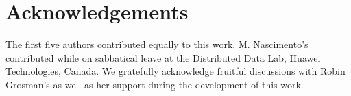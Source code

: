 \documentclass[runningheads]{llncs}
\begin{document}
	\begin{comment}
	Most recently proposed automatic augmentation methods are computationally expensive as they rely on the use of a proxy model and search for the optimum parameters (for that given proxy model) for the augmentation operations.
	With the ultimate goal of completely forgoing such search, we proposed UniformAugment (UA). With the support of theoretical analysis, UA uniformly samples augmentation operations from a continuous augmentation space, therefore not requiring any search. By doing that UA, adds adequate diversity to the training data, allowing the trained model to deliver performance comparable to the existing search-based methods, but much more efficiently.  
	
	In this paper we demonstrated that if the augmentation space is approximately invariant which relatively restricts generating out of distribution samples, the need to search within this space for optimum parameters is eliminated. Furthermore, we showed that the default predefined ranges for transform operations help creating an augmentation space with aforementioned criteria. For tasks and domains where no predefined in-distribution space is known, a search is needed to set the boundaries of the augmentations space, while satisfying the approximately invariant criteria and adding as much diversity to the data as possible.  As part of our future work, we aim to conduct search on the operations' ranges and NumOps parameter, to find the ideally optimum in-distribution search space for different tasks and datasets. 
	
	Based on our findings, we argue that searching for the approximately invariant augmentation space for a given task is more important than searching for the optimum parameters within a given augmentation space. If such space is given, then no search is needed, and an approach such as UA is bound to perform well for that task. 


	An interesting direction for further work is to compare UA's effectiveness against approaches using adversarial methods for policy generation \cite{zhang2019adversarial}.  While that approach does not have a proxy-model search \emph{per se}, it requires a more expensive training process. It would be interesting to deploy UA in a similar setting with batch augmentation \cite{hoffer2019augment}, to investigate its effectiveness with larger augmented batches. 
	\end{comment}
	
	\section{Acknowledgements}
	The first five authors contributed equally to this work. 
	M. Nascimento's contributed while on sabbatical leave at the Distributed Data Lab, Huawei Technologies, Canada.
	We gratefully acknowledge fruitful discussions with Robin Grosman's as well as her support during the development of this work.
	
	




	
	
	
\end{document}
